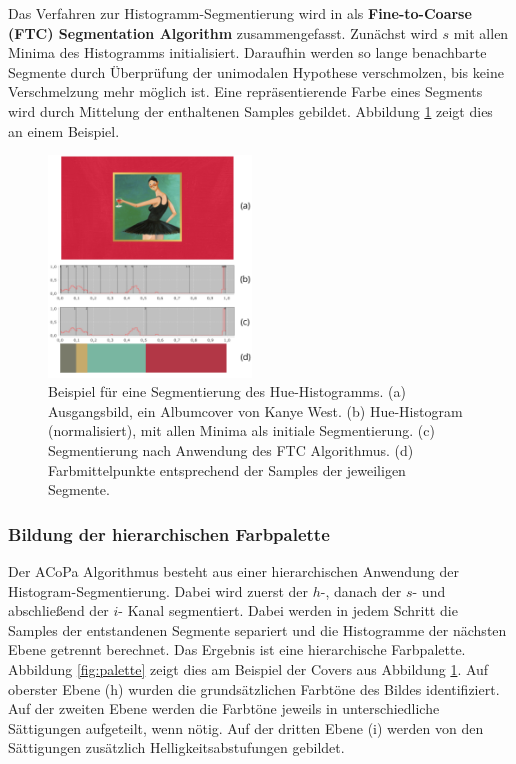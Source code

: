 Das Verfahren zur Histogramm-Segmentierung wird in \citep{ftc} als \textbf{Fine-to-Coarse (FTC) Segmentation Algorithm} zusammengefasst. Zunächst wird $s$ mit allen Minima des Histogramms initialisiert. Daraufhin werden so lange benachbarte Segmente durch Überprüfung der unimodalen Hypothese verschmolzen, bis keine Verschmelzung mehr möglich ist. Eine repräsentierende Farbe eines Segments wird durch Mittelung der enthaltenen Samples gebildet. Abbildung \ref{fig:h_segmentation} zeigt dies an einem Beispiel.

\begin{figure}[h]
\centering
\includegraphics[width=0.48\textwidth]{img/h_segmentation.png}
\caption{Beispiel für eine Segmentierung des Hue-Histogramms. (a) Ausgangsbild, ein Albumcover  von Kanye West. (b) Hue-Histogram (normalisiert), mit allen Minima als initiale Segmentierung. (c) Segmentierung nach Anwendung des FTC Algorithmus. (d) Farbmittelpunkte entsprechend der Samples der jeweiligen Segmente.}
\label{fig:h_segmentation}
\end{figure}

\subsubsection{Bildung der hierarchischen Farbpalette}
\label{sec:hierarchische-farbpalette}

Der ACoPa Algorithmus besteht aus einer hierarchischen Anwendung der Histogram-Segmentierung. Dabei wird zuerst der $h$-, danach der $s$- und abschließend der $i$- Kanal segmentiert. Dabei werden in jedem Schritt die Samples der entstandenen Segmente separiert und die Histogramme der nächsten Ebene getrennt berechnet. Das Ergebnis ist eine hierarchische Farbpalette. Abbildung \ref{fig:palette} zeigt dies am Beispiel der Covers aus Abbildung \ref{fig:h_segmentation}. Auf oberster Ebene (h) wurden die grundsätzlichen Farbtöne des Bildes identifiziert. Auf der zweiten Ebene werden die Farbtöne jeweils in unterschiedliche Sättigungen aufgeteilt, wenn nötig. Auf der dritten Ebene (i) werden von den Sättigungen zusätzlich Helligkeitsabstufungen gebildet.

